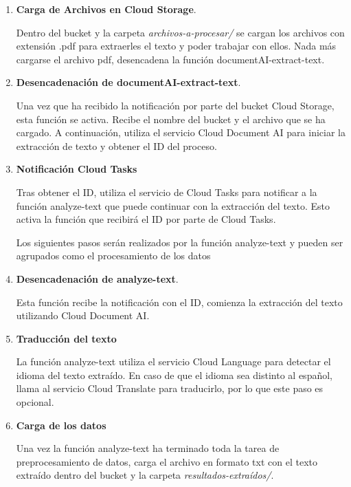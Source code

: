 \begin{enumerate}
    \item \textbf{Carga de Archivos en Cloud Storage}. 
    
    Dentro del bucket y la carpeta \textit{archivos-a-procesar/} se cargan los archivos con extensión .pdf para extraerles el texto y poder trabajar con ellos. Nada más cargarse el archivo pdf, desencadena la función documentAI-extract-text. 
    
    \item \textbf{Desencadenación de documentAI-extract-text}. 
    
    Una vez que ha recibido la notificación por parte del bucket Cloud Storage, esta función se activa. Recibe el nombre del bucket y el archivo que se ha cargado. A continuación, utiliza el servicio Cloud Document AI para iniciar la extracción de texto y obtener el ID del proceso.
    
    \item \textbf{Notificación Cloud Tasks}
    
    Tras obtener el ID, utiliza el servicio de Cloud Tasks para notificar a la función analyze-text que puede continuar con la extracción del texto. Esto activa la función que recibirá el ID por parte de Cloud Tasks.

    Los siguientes pasos serán realizados por la función analyze-text y pueden ser agrupados como el procesamiento de los datos

    \item \textbf{Desencadenación de analyze-text}.

    Esta función recibe la notificación con el ID, comienza la extracción del texto utilizando Cloud Document AI.

    \item \textbf{Traducción del texto}
    
    La función analyze-text utiliza el servicio Cloud Language para detectar el idioma del texto extraído. En caso de que el idioma sea distinto al español, llama al servicio Cloud Translate para traducirlo, por lo que este paso es opcional.

    \item \textbf{Carga de los datos}
    
    Una vez la función analyze-text ha terminado toda la tarea de preprocesamiento de datos, carga el archivo en formato txt con el texto extraído dentro del bucket y la carpeta \textit{resultados-extraídos/}.
    
\end{enumerate}

